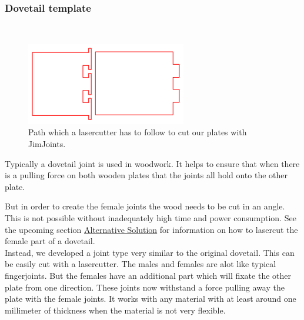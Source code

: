 \documentclass[../ClassicThesis.tex]{subfiles}
\begin{document}
\subsubsection{Dovetail template}
\\
    \begin{minipage}{0.4\textwidth}
    \begin{figure}[!ht]
    \centering
    \includegraphics[width=1\columnwidth]{Images/schwalbe.png}
    \caption{Path which a lasercutter has to follow to cut our plates with JimJoints.}
    \end{figure}
    
    \end{minipage}
    \begin{minipage}{0.6\textwidth}
    Typically a dovetail joint is used in woodwork. It helps to ensure that when there is a pulling force on both wooden plates that the joints all hold onto the other plate.\\
    \end{minipage}
    But in order to create the female joints the wood needs to be cut in an angle. This is not possible without inadequately high time and power consumption. See the upcoming section \hyperref[alternativeSolution]{Alternative Solution} for information on how to lasercut the female part of a dovetail.\\
    Instead, we developed a joint type very similar to the original dovetail. This can be easily cut with a lasercutter.
    The males and females are alot like typical fingerjoints. But the females have an additional part which will fixate the other plate from one direction.
    These joints now withstand a force pulling away the plate with the female joints. It works with any material with at least around one millimeter of thickness when the material is not very flexible.
\end{document}
